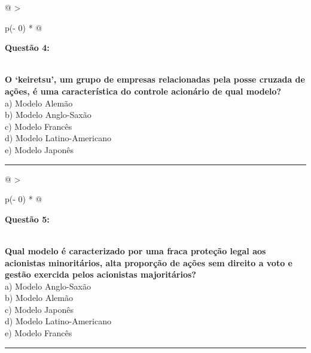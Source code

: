 \documentclass[
]{book}
\begin{document}
\begin{longtable}[]{@{}
  >{\raggedright\arraybackslash}p{(\columnwidth - 0\tabcolsep) * }@{}}
\toprule\noalign{}
\begin{minipage}[b]{\linewidth}\raggedright
\textbf{Questão 4:}
\end{minipage} \\
\midrule\noalign{}
\endhead
\bottomrule\noalign{}
\endlastfoot
\textbf{O `keiretsu', um grupo de empresas relacionadas pela posse cruzada de ações, é uma característica do controle acionário de qual modelo?} \\
a) Modelo Alemão \\
b) Modelo Anglo-Saxão \\
c) Modelo Francês \\
d) Modelo Latino-Americano \\
e) Modelo Japonês \\
\end{longtable}

\begin{center}\rule{0.5\linewidth}{0.5pt}\end{center}

\begin{longtable}[]{@{}
  >{\raggedright\arraybackslash}p{(\columnwidth - 0\tabcolsep) * }@{}}
\toprule\noalign{}
\begin{minipage}[b]{\linewidth}\raggedright
\textbf{Questão 5:}
\end{minipage} \\
\midrule\noalign{}
\endhead
\bottomrule\noalign{}
\endlastfoot
\textbf{Qual modelo é caracterizado por uma fraca proteção legal aos acionistas minoritários, alta proporção de ações sem direito a voto e gestão exercida pelos acionistas majoritários?} \\
a) Modelo Anglo-Saxão \\
b) Modelo Alemão \\
c) Modelo Japonês \\
d) Modelo Latino-Americano \\
e) Modelo Francês \\
\end{longtable}

\begin{center}\rule{0.5\linewidth}{0.5pt}\end{center}
\end{document}
